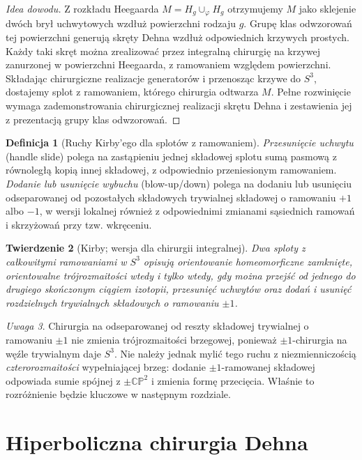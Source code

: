 \documentclass[11pt,a4paper]{report}
\numberwithin{equation}{section}
\theoremstyle{plain}
\newtheorem{twierdzenie}{Twierdzenie}[section]
\theoremstyle{definition}
\newtheorem{definicja}[twierdzenie]{Definicja}
\theoremstyle{remark}
\newtheorem{uwaga}[twierdzenie]{Uwaga}
\begin{document}
\begin{proof}[Idea dowodu]
Z rozkładu Heegaarda $M=H_g\cup_\varphi H_g$ otrzymujemy
$M$ jako sklejenie dwóch brył uchwytowych wzdłuż
powierzchni rodzaju $g$. Grupę klas odwzorowań tej
powierzchni generują skręty Dehna wzdłuż odpowiednich
krzywych prostych. Każdy taki skręt można zrealizować
przez integralną chirurgię na krzywej zanurzonej
w powierzchni Heegaarda, z ramowaniem względem powierzchni.
Składając chirurgiczne realizacje generatorów i przenosząc
krzywe do $S^3$, dostajemy splot z ramowaniem, którego
chirurgia odtwarza $M$. Pełne rozwinięcie wymaga
zademonstrowania chirurgicznej realizacji skrętu Dehna
i zestawienia jej z prezentacją grupy klas odwzorowań.
\end{proof}

\begin{definicja}[Ruchy Kirby'ego dla splotów z ramowaniem]
\emph{Przesunięcie uchwytu} (handle slide) polega na zastąpieniu
jednej składowej splotu sumą pasmową z równoległą kopią
innej składowej, z odpowiednio przeniesionym ramowaniem.
\emph{Dodanie lub usunięcie wybuchu} (blow-up/down)
polega na dodaniu lub usunięciu odseparowanej od pozostałych
składowych trywialnej składowej o ramowaniu $+1$ albo $-1$,
w wersji lokalnej również z odpowiednimi zmianami sąsiednich
ramowań i skrzyżowań przy tzw. wkręceniu.
\end{definicja}

\begin{twierdzenie}[Kirby; wersja dla chirurgii integralnej]
Dwa sploty z całkowitymi ramowaniami w $S^3$ opisują
orientowanie homeomorficzne zamknięte, orientowalne
trójrozmaitości wtedy i tylko wtedy, gdy można przejść
od jednego do drugiego skończonym ciągiem izotopii,
przesunięć uchwytów oraz dodań i usunięć rozdzielnych
trywialnych składowych o ramowaniu $\pm1$.
\end{twierdzenie}

\begin{uwaga}
Chirurgia na odseparowanej od reszty składowej trywialnej
o ramowaniu $\pm1$ nie zmienia trójrozmaitości brzegowej,
ponieważ $\pm1$-chirurgia na węźle trywialnym daje $S^3$.
Nie należy jednak mylić tego ruchu z niezmienniczością
\emph{czterorozmaitości} wypełniającej brzeg: dodanie
$\pm1$-ramowanej składowej odpowiada sumie spójnej
z $\pm\mathbb{CP}^2$ i zmienia formę przecięcia.
Właśnie to rozróżnienie będzie kluczowe w następnym rozdziale.
\end{uwaga}

\section{Hiperboliczna chirurgia Dehna}
\label{sec:kt-hyper-dehn}
\end{document}

